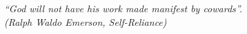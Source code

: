 \begin{epigrafe}
    \vspace*{\fill}
	\begin{flushright}
		\textit{“God will not have his work made manifest by cowards”.\\
		(Ralph Waldo Emerson, Self-Reliance)}
	\end{flushright}
\end{epigrafe}

